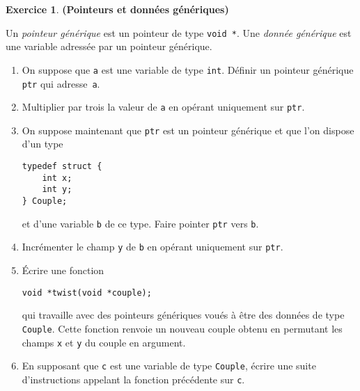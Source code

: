 \documentclass[12pt]{article}
\theoremstyle{definition}
\newtheorem{Exercice}{Exercice}
\begin{document}
\begin{Exercice} {\bf (Pointeurs et données génériques)}\smallskip

Un {\em pointeur générique} est un pointeur de type {\tt void *}. Une
{\em donnée générique} est une variable adressée par un pointeur
générique.
\begin{enumerate}
    \item On suppose que {\tt a} est une variable de type {\tt int}.
    Définir un pointeur générique {\tt ptr} qui adresse~{\tt a}.
    \smallskip

    \item Multiplier par trois la valeur de {\tt a} en opérant uniquement
    sur {\tt ptr}.
    \smallskip

    \item On suppose maintenant que {\tt ptr} est un pointeur générique
    et que l'on dispose d'un type
\begin{lstlisting}
typedef struct {
    int x;
    int y;
} Couple;
\end{lstlisting}
    et d'une variable {\tt b} de ce type. Faire pointer {\tt ptr} vers
    {\tt b}.
    \smallskip

    \item Incrémenter le champ {\tt y} de {\tt b} en opérant uniquement
    sur {\tt ptr}.
    \smallskip

    \item Écrire une fonction
\begin{lstlisting}
void *twist(void *couple);
\end{lstlisting}
    qui travaille avec des pointeurs génériques voués à être des données
    de type {\tt Couple}. Cette fonction renvoie un nouveau couple
    obtenu en permutant les champs {\tt x} et {\tt y} du couple en
    argument.
    \smallskip

    \item En supposant que {\tt c} est une variable de type {\tt Couple},
    écrire une suite d'instructions appelant la fonction précédente
    sur {\tt c}.
\end{enumerate}
\end{Exercice}
\bigskip
\end{document}
